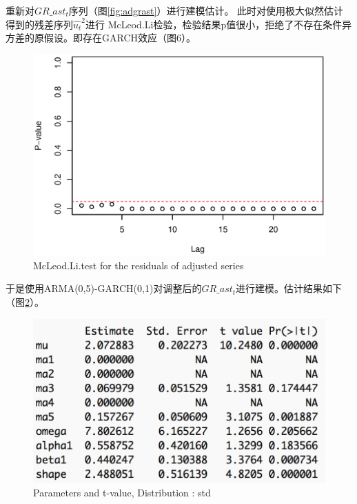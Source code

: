 \documentclass[10.5pt,onecolumn,a4paper]{article}%
\begin{document}
重新对${GR\_ast_t}$序列（图\ref{fig:adgrast}）进行建模估计。
此时对使用极大似然估计得到的残差序列${\hat{u_t}^2}$进行 McLeod.Li检验，检验结果p值很小，拒绝了不存在条件异方差的原假设。即存在GARCH效应（图6）。
\begin{figure}
	\begin{center}
	\includegraphics[width=0.5\linewidth]{pic/mcr2}
	\caption{McLeod.Li.test for the residuals of adjusted series}
	\label{fig:mcr2}
	\end{center}
\end{figure}

于是使用ARMA(0,5)-GARCH(0,1)对调整后的${GR\_ast_{t}}$进行建模。估计结果如下（图\ref{fig:astg}）。

\begin{figure}
	\begin{center}
	\includegraphics[width=0.7\linewidth]{pic/astgarch}
	\caption{Parameters and t-value,  Distribution	: std }
	\label{fig:astg}
	\end{center}
\end{figure}
\end{document}
